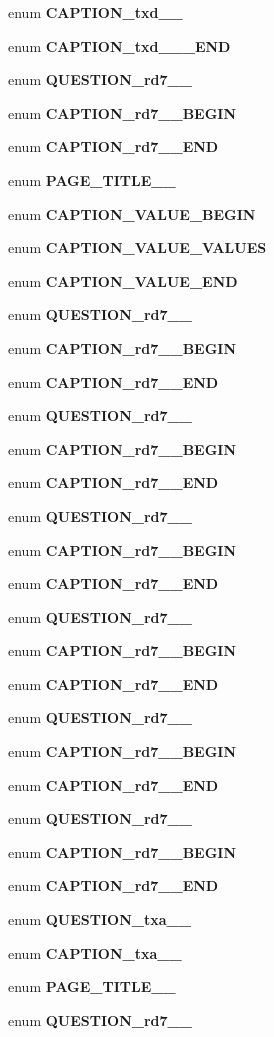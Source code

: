 \begin{CompactItemize}
enum {\bf CAPTION\_\-txd\_\_\-} 
\item 
enum {\bf CAPTION\_\-txd\_\_\-\_\-END} 
\item 
enum {\bf QUESTION\_\-rd7\_\_\-} 
\item 
enum {\bf CAPTION\_\-rd7\_\_\-BEGIN} 
\item 
enum {\bf CAPTION\_\-rd7\_\_\-END} 
\item 
enum {\bf PAGE\_\-TITLE\_\_\-} 
\item 
enum {\bf CAPTION\_\-VALUE\_\-BEGIN} 
\item 
enum {\bf CAPTION\_\-VALUE\_\-VALUES} 
\item 
enum {\bf CAPTION\_\-VALUE\_\-END} 
\item 
enum {\bf QUESTION\_\-rd7\_\_\-} 
\item 
enum {\bf CAPTION\_\-rd7\_\_\-BEGIN} 
\item 
enum {\bf CAPTION\_\-rd7\_\_\-END} 
\item 
enum {\bf QUESTION\_\-rd7\_\_\-} 
\item 
enum {\bf CAPTION\_\-rd7\_\_\-BEGIN} 
\item 
enum {\bf CAPTION\_\-rd7\_\_\-END} 
\item 
enum {\bf QUESTION\_\-rd7\_\_\-} 
\item 
enum {\bf CAPTION\_\-rd7\_\_\-BEGIN} 
\item 
enum {\bf CAPTION\_\-rd7\_\_\-END} 
\item 
enum {\bf QUESTION\_\-rd7\_\_\-} 
\item 
enum {\bf CAPTION\_\-rd7\_\_\-BEGIN} 
\item 
enum {\bf CAPTION\_\-rd7\_\_\-END} 
\item 
enum {\bf QUESTION\_\-rd7\_\_\-} 
\item 
enum {\bf CAPTION\_\-rd7\_\_\-BEGIN} 
\item 
enum {\bf CAPTION\_\-rd7\_\_\-END} 
\item 
enum {\bf QUESTION\_\-rd7\_\_\-} 
\item 
enum {\bf CAPTION\_\-rd7\_\_\-BEGIN} 
\item 
enum {\bf CAPTION\_\-rd7\_\_\-END} 
\item 
enum {\bf QUESTION\_\-txa\_\_\-} 
\item 
enum {\bf CAPTION\_\-txa\_\_\-} 
\item 
enum {\bf PAGE\_\-TITLE\_\_\-} 
\item 
enum {\bf QUESTION\_\-rd7\_\_\-} 

\end{CompactItemize}
